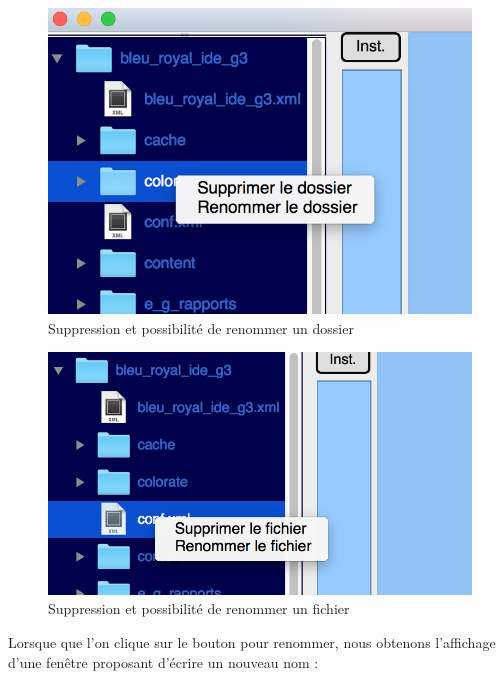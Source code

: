 \documentclass[a4paper,12pt]{article}
\begin{document}
\begin{figure}[h!]
			\begin{center}
				\includegraphics[scale=0.5]{images/right-click-dir.png}
				\caption{Suppression et possibilité de renommer un dossier}
			\end{center}
		\end{figure}
		
\begin{figure}[h!]
			\begin{center}
				\includegraphics[scale=0.5]{images/right_click_file.png}
				\caption{Suppression et possibilité de renommer un fichier}
			\end{center}
		\end{figure}
		
Lorsque que l'on clique sur le bouton pour renommer, nous obtenons l'affichage d'une fenêtre proposant d'écrire un nouveau nom :
\end{document}
